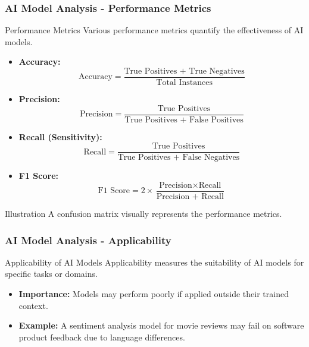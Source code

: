 \documentclass[aspectratio=169]{beamer}
\begin{document}
\begin{frame}[fragile]
    \frametitle{AI Model Analysis - Performance Metrics}
    \begin{block}{Performance Metrics}
        Various performance metrics quantify the effectiveness of AI models.
    \end{block}
    \begin{itemize}
        \item \textbf{Accuracy:} 
        \begin{equation}
            \text{Accuracy} = \frac{\text{True Positives + True Negatives}}{\text{Total Instances}}
        \end{equation}

        \item \textbf{Precision:} 
        \begin{equation}
            \text{Precision} = \frac{\text{True Positives}}{\text{True Positives + False Positives}}
        \end{equation}

        \item \textbf{Recall (Sensitivity):} 
        \begin{equation}
            \text{Recall} = \frac{\text{True Positives}}{\text{True Positives + False Negatives}}
        \end{equation}

        \item \textbf{F1 Score:} 
        \begin{equation}
            \text{F1 Score} = 2 \times \frac{\text{Precision} \times \text{Recall}}{\text{Precision + Recall}}
        \end{equation}
    \end{itemize}
    \begin{block}{Illustration}
        A confusion matrix visually represents the performance metrics.
    \end{block}
\end{frame}

\begin{frame}[fragile]
    \frametitle{AI Model Analysis - Applicability}
    \begin{block}{Applicability of AI Models}
        Applicability measures the suitability of AI models for specific tasks or domains.
    \end{block}
    \begin{itemize}
        \item \textbf{Importance:} Models may perform poorly if applied outside their trained context.
        \item \textbf{Example:} A sentiment analysis model for movie reviews may fail on software product feedback due to language differences.
    \end{itemize}
\end{frame}
\end{document}
